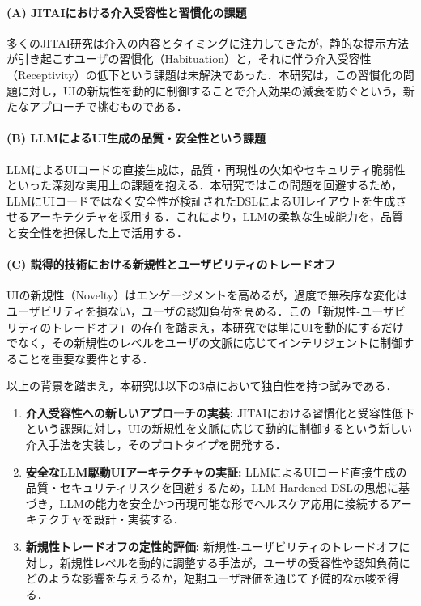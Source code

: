 \documentclass[twocolumn]{jarticle}
\begin{document}
\paragraph{(A) JITAIにおける介入受容性と習慣化の課題}
多くのJITAI研究は介入の内容とタイミングに注力してきたが\cite{nahum2016jitai}，静的な提示方法が引き起こすユーザの習慣化（Habituation）と，それに伴う介入受容性（Receptivity）の低下という課題は未解決であった\cite{mohammadi2022detecting}\cite{rabbi2015behavioral}．本研究は，この習慣化の問題に対し，UIの新規性を動的に制御することで介入効果の減衰を防ぐという，新たなアプローチで挑むものである．

\paragraph{(B) LLMによるUI生成の品質・安全性という課題}
LLMによるUIコードの直接生成は，品質・再現性の欠如\cite{wu2024uicoder}やセキュリティ脆弱性\cite{asare2023large}といった深刻な実用上の課題を抱える．本研究ではこの問題を回避するため，LLMにUIコードではなく安全性が検証されたDSLによるUIレイアウトを生成させるアーキテクチャを採用する．これにより，LLMの柔軟な生成能力を，品質と安全性を担保した上で活用する．

\paragraph{(C) 説得的技術における新規性とユーザビリティのトレードオフ}
UIの新規性（Novelty）はエンゲージメントを高めるが\cite{fogg2002persuasive}，過度で無秩序な変化はユーザビリティを損ない，ユーザの認知負荷を高める\cite{gong2022adaptive}．この「新規性-ユーザビリティのトレードオフ」の存在を踏まえ，本研究では単にUIを動的にするだけでなく，その新規性のレベルをユーザの文脈に応じてインテリジェントに制御することを重要な要件とする．

\vspace{2mm}
\noindent
以上の背景を踏まえ，本研究は以下の3点において独自性を持つ試みである．
\begin{enumerate}[label=(\Alph*)] 
    \item \textbf{介入受容性への新しいアプローチの実装:} JITAIにおける習慣化と受容性低下という課題に対し，UIの新規性を文脈に応じて動的に制御するという新しい介入手法を実装し，そのプロトタイプを開発する．
    \item \textbf{安全なLLM駆動UIアーキテクチャの実証:} LLMによるUIコード直接生成の品質・セキュリティリスクを回避するため，LLM-Hardened DSLの思想に基づき，LLMの能力を安全かつ再現可能な形でヘルスケア応用に接続するアーキテクチャを設計・実装する．
    \item \textbf{新規性トレードオフの定性的評価:} 新規性-ユーザビリティのトレードオフに対し，新規性レベルを動的に調整する手法が，ユーザの受容性や認知負荷にどのような影響を与えうるか，短期ユーザ評価を通じて予備的な示唆を得る．
\end{enumerate}
\end{document}
